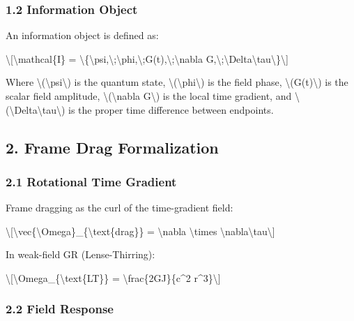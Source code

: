 \documentclass[
  10pt,
]{article}
\begin{document}
\hypertarget{information-object}{%
\subsubsection{1.2 Information Object}\label{information-object}}

An information object is defined as:

\textbackslash{[}\textbackslash mathcal\{I\} =
\textbackslash\{\textbackslash psi,\textbackslash;\textbackslash phi,\textbackslash;G(t),\textbackslash;\textbackslash nabla
G,\textbackslash;\textbackslash Delta\textbackslash tau\textbackslash\}\textbackslash{]}

Where \textbackslash(\textbackslash psi\textbackslash) is the quantum
state, \textbackslash(\textbackslash phi\textbackslash) is the field
phase, \textbackslash(G(t)\textbackslash) is the scalar field amplitude,
\textbackslash(\textbackslash nabla G\textbackslash) is the local time
gradient, and
\textbackslash(\textbackslash Delta\textbackslash tau\textbackslash) is
the proper time difference between endpoints.

\hypertarget{frame-drag-formalization}{%
\subsection{2. Frame Drag
Formalization}\label{frame-drag-formalization}}

\hypertarget{rotational-time-gradient}{%
\subsubsection{2.1 Rotational Time
Gradient}\label{rotational-time-gradient}}

Frame dragging as the curl of the time-gradient field:

\textbackslash{[}\textbackslash vec\{\textbackslash Omega\}\_\{\textbackslash text\{drag\}\}
= \textbackslash nabla \textbackslash times
\textbackslash nabla\textbackslash tau\textbackslash{]}

In weak-field GR (Lense-Thirring):

\textbackslash{[}\textbackslash Omega\_\{\textbackslash text\{LT\}\} =
\textbackslash frac\{2GJ\}\{c\^{}2 r\^{}3\}\textbackslash{]}

\hypertarget{field-response}{%
\subsubsection{2.2 Field Response}\label{field-response}}
\end{document}
